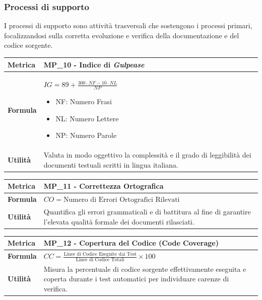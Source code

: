 \documentclass[12pt, a4paper]{article}
\begin{document}
\subsubsection{Processi di supporto}
I processi di supporto sono attività trasversali che sostengono i processi primari, focalizzandosi sulla corretta evoluzione e verifica della documentazione e del codice sorgente.



\begin{table}[H]
\centering
\renewcommand{\arraystretch}{1.5}
\begin{tabular}{|l|p{12cm}|}
\hline
\textbf{Metrica} & MP\_10 - Indice di \textit{Gulpease} \\ \hline
\textbf{Formula} & $IG=89+\frac{300\cdot NF-10\cdot NL}{NP}$ 
\begin{itemize}
    \item NF: Numero Frasi
    \item NL: Numero Lettere
    \item NP: Numero Parole
\end{itemize}\\ \hline
\textbf{Utilità} & Valuta in modo oggettivo la complessità e il grado di leggibilità dei documenti testuali scritti in lingua italiana. \\ \hline
\end{tabular}
\end{table}

\begin{table}[H]
\centering
\renewcommand{\arraystretch}{1.5}
\begin{tabular}{|l|p{12cm}|}
\hline
\textbf{Metrica} & MP\_11 - Correttezza Ortografica \\ \hline
\textbf{Formula} & $CO = \text{Numero di Errori Ortografici Rilevati}$ \\ \hline
\textbf{Utilità} & Quantifica gli errori grammaticali e di battitura al fine di garantire l'elevata qualità formale dei documenti rilasciati. \\ \hline
\end{tabular}
\end{table}


\begin{table}[H]
\centering
\renewcommand{\arraystretch}{1.5}
\begin{tabular}{|l|p{12cm}|}
\hline
\textbf{Metrica} & MP\_12 - Copertura del Codice (Code Coverage) \\ \hline
\textbf{Formula} & $CC=\frac{\text{Linee di Codice Eseguite dai Test}}{\text{Linee di Codice Totali}}\times 100$ \\ \hline
\textbf{Utilità} & Misura la percentuale di codice sorgente effettivamente eseguita e coperta durante i test automatici per individuare carenze di verifica. \\ \hline
\end{tabular}
\end{table}
\end{document}
